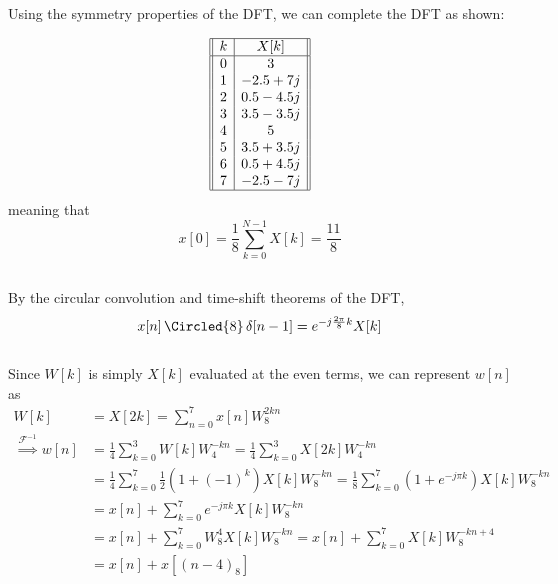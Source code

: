 \documentclass{article}
\begin{document}
\subsection{}

Using the symmetry properties of the DFT, we can complete the DFT as shown:

\begin{equation}
    \begin{array}[]{||c|c||}
        \hline
        k & X[k] \\
        \hline
        0 & 3 \\
        1 & -2.5 + 7j \\
        2 & 0.5 - 4.5j \\
        3 & 3.5 - 3.5j \\
        4 & 5 \\
        5 & 3.5 + 3.5j \\
        6 & 0.5 + 4.5j \\
        7 & -2.5 - 7j \\
        \hline
    \end{array}
\end{equation}
meaning that
\begin{equation}
    x[0] = \frac{1}{8} \sum_{k = 0}^{N - 1} X[k] = \frac{11}{8}
\end{equation}

\subsection{}

By the circular convolution and time-shift theorems of the DFT,
\begin{equation}
    x[n] \, \Circled{8} \, \delta[n - 1] = e^{-j \frac{2\pi}{8} k} X[k]
\end{equation}

\subsection{}

Since \(W[k]\) is simply \(X[k]\) evaluated at the even terms, we can represent \(w[n]\) as
\begin{align}
    W[k] &= X[2k] = \sum_{n = 0}^7 x[n] W_8^{2kn} \\
    \overset{\mathcal{F}^{-1}}{\implies} w[n] &= \frac{1}{4} \sum_{k = 0}^3 W[k] W_4^{-kn} = \frac{1}{4} \sum_{k = 0}^3 X[2k] W_4^{-kn} \\
    &= \frac{1}{4} \sum_{k = 0}^7 \frac{1}{2} (1 + (-1)^k) X[k] W_8^{-kn} = \frac{1}{8} \sum_{k = 0}^7 (1 + e^{-j \pi k}) X[k] W_8^{-kn} \\
    &= x[n] + \sum_{k = 0}^7 e^{-j \pi k} X[k] W_8^{-kn} \\
    &= x[n] + \sum_{k = 0}^7 W_8^4 X[k] W_8^{-kn} = x[n] + \sum_{k = 0}^7 X[k] W_8^{-kn + 4} \\
    &= x[n] + x[(n - 4)_8]
\end{align}
\end{document}
